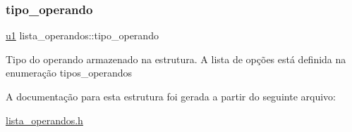 \subsubsection{\texorpdfstring{tipo\+\_\+operando}{tipo\_operando}}
{\footnotesize\ttfamily \hyperlink{lista__operandos_8h_ad9f4cdb6757615aae2fad89dab3c5470}{u1} lista\+\_\+operandos\+::tipo\+\_\+operando}

Tipo do operando armazenado na estrutura. A lista de opções está definida na enumeração {\ttfamily tipos\+\_\+operandos} 

A documentação para esta estrutura foi gerada a partir do seguinte arquivo\+:\begin{DoxyCompactItemize}
\item 
\hyperlink{lista__operandos_8h}{lista\+\_\+operandos.\+h}\end{DoxyCompactItemize}
